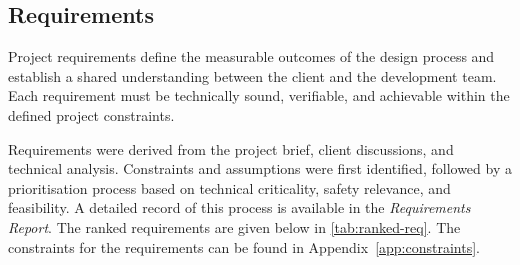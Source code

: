 \subsection{Requirements}
\label{sec:ranked-requirements}

Project requirements define the measurable outcomes of the design process and establish a shared understanding between the client and the development team. Each requirement must be technically sound, verifiable, and achievable within the defined project constraints. 

Requirements were derived from the project brief, client discussions, and technical analysis. Constraints and assumptions were first identified, followed by a prioritisation process based on technical criticality, safety relevance, and feasibility. A detailed record of this process is available in the \textit{Requirements Report}. The ranked requirements are given below in \ref{tab:ranked-req}. The constraints for the requirements can be found in Appendix~\ref{app:constraints}.

